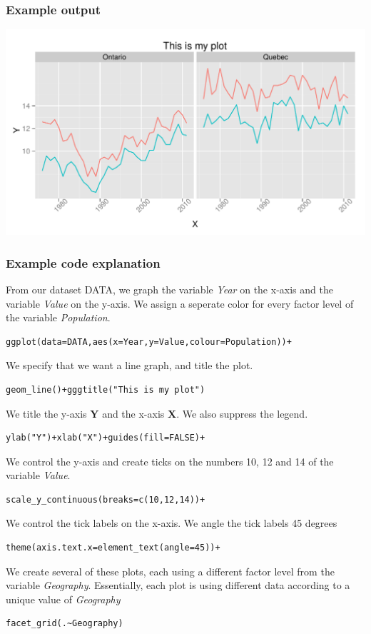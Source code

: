 \documentclass[nogin]{beamer}\usepackage[]{graphicx}\usepackage[]{color}
\makeatletter
\def\maxwidth{ %
  \ifdim\Gin@nat@width>\linewidth
    \linewidth
  \else
    \Gin@nat@width
  \fi
}
\newenvironment{knitrout}{}{} %
\makeatother
\begin{document}
\begin{frame}[fragile]
\frametitle{Example output}
\begin{knitrout}
\color{fgcolor}
\includegraphics[width=\maxwidth]{figure/unnamed-chunk-4} 

\end{knitrout}

\end{frame}

\begin{frame}[fragile]
\frametitle{Example code explanation}
\scriptsize
From our dataset DATA, we graph the variable \emph{Year} on the x-axis and the variable \emph{Value} on the y-axis. We assign a seperate color for every  factor level of the variable \emph{Population}.
\begin{verbatim}ggplot(data=DATA,aes(x=Year,y=Value,colour=Population))+\end{verbatim}
We specify that we want a line graph, and title the plot.
\begin{verbatim}geom_line()+gggtitle("This is my plot")\end{verbatim}
We title the y-axis \textbf{Y} and the x-axis \textbf{X}. We also suppress the legend.
\begin{verbatim}ylab("Y")+xlab("X")+guides(fill=FALSE)+\end{verbatim}
We control the y-axis and create ticks on the numbers 10, 12 and 14 of the variable \emph{Value}.
\begin{verbatim}scale_y_continuous(breaks=c(10,12,14))+ \end{verbatim}
We control the tick labels on the x-axis. We angle the tick labels 45 degrees
\begin{verbatim}theme(axis.text.x=element_text(angle=45))+
\end{verbatim}
We create several of these plots, each using a different factor level from the variable \emph{Geography}. Essentially, each plot is using different data according to a unique value of \emph{Geography}
\begin{verbatim}facet_grid(.~Geography)\end{verbatim}
\end{frame}
\end{document}
